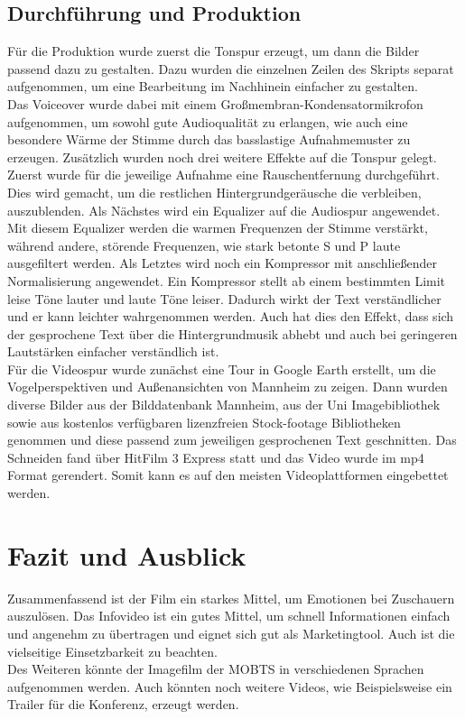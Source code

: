 \subsection{Durchführung und Produktion}
Für die Produktion wurde zuerst die Tonspur erzeugt, um dann die Bilder passend dazu zu gestalten. Dazu wurden die einzelnen Zeilen des Skripts separat aufgenommen, um eine Bearbeitung im Nachhinein einfacher zu gestalten.\\
Das Voiceover wurde dabei mit einem Großmembran-Kondensatormikrofon aufgenommen, um sowohl gute Audioqualität zu erlangen, wie auch eine besondere Wärme der Stimme durch das basslastige Aufnahmemuster zu erzeugen. Zusätzlich wurden noch drei weitere Effekte auf die Tonspur gelegt. Zuerst wurde für die jeweilige Aufnahme eine Rauschentfernung durchgeführt. Dies wird gemacht, um die restlichen Hintergrundgeräusche die verbleiben, auszublenden. Als Nächstes wird ein Equalizer auf die Audiospur angewendet. Mit diesem Equalizer werden die warmen Frequenzen der Stimme verstärkt, während andere, störende Frequenzen, wie stark betonte S und P laute ausgefiltert werden. Als Letztes wird noch ein Kompressor mit anschließender Normalisierung angewendet. Ein Kompressor stellt ab einem bestimmten Limit leise Töne lauter und laute Töne leiser. Dadurch wirkt der Text verständlicher und er kann leichter wahrgenommen werden. Auch hat dies den Effekt, dass sich der gesprochene Text über die Hintergrundmusik abhebt und auch bei geringeren Lautstärken einfacher verständlich ist.\\
Für die Videospur wurde zunächst eine Tour in Google Earth erstellt, um die Vogelperspektiven und Außenansichten von Mannheim zu zeigen. Dann wurden diverse Bilder aus der Bilddatenbank Mannheim, aus der Uni Imagebibliothek sowie aus kostenlos verfügbaren lizenzfreien Stock-footage Bibliotheken genommen und diese passend zum jeweiligen gesprochenen Text geschnitten. Das Schneiden fand über HitFilm 3 Express statt und das Video wurde im mp4 Format gerendert. Somit kann es auf den meisten Videoplattformen eingebettet werden.
\section{Fazit und Ausblick}
Zusammenfassend ist der Film ein starkes Mittel, um Emotionen bei Zuschauern auszulösen. Das Infovideo ist ein gutes Mittel, um schnell Informationen einfach und angenehm zu übertragen und eignet sich gut als Marketingtool. Auch ist die vielseitige Einsetzbarkeit zu beachten.\\
Des Weiteren könnte der Imagefilm der \ac{MOBTS} in verschiedenen Sprachen aufgenommen werden. Auch könnten noch weitere Videos, wie Beispielsweise ein Trailer für die Konferenz, erzeugt werden.
